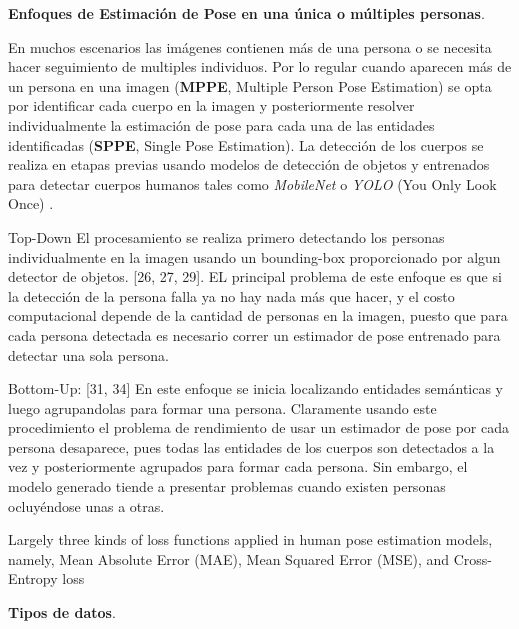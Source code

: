 \textbf{ Enfoques de Estimación de Pose en una única o múltiples personas}.

En muchos escenarios las imágenes contienen más de una persona o se necesita hacer seguimiento
de multiples individuos. Por lo regular cuando aparecen más de un persona en una imagen
(\textbf{MPPE}, Multiple Person Pose Estimation)
se opta por identificar cada cuerpo en la imagen y posteriormente resolver individualmente
la estimación de pose para cada una de las entidades identificadas (\textbf{SPPE}, Single Pose Estimation).
La detección de los cuerpos se realiza en
etapas previas usando modelos de detección de objetos y entrenados para detectar cuerpos
humanos tales como \textit{MobileNet} \cite{DBLP:journals/corr/RenHG015}
\cite{DBLP:journals/corr/HowardZCKWWAA17} \cite{DBLP:journals/corr/abs-1801-04381} o \textit{YOLO}
(You Only Look Once) \cite{DBLP:journals/corr/RedmonDGF15} \cite{DBLP:journals/corr/abs-2004-10934}.


Top-Down El procesamiento se realiza primero detectando los personas individualmente en la imagen
usando un bounding-box proporcionado por algun detector de objetos. [26, 27, 29].
EL principal problema de este enfoque es que si la detección de la persona falla ya no hay nada más
que hacer, y el costo computacional depende de la cantidad de personas en la imagen, puesto que para
cada persona detectada es necesario correr un estimador de pose entrenado para detectar una sola
persona.

Bottom-Up: [31, 34] En este enfoque se inicia localizando entidades semánticas y luego agrupandolas
para formar una persona. Claramente usando este procedimiento el problema de rendimiento de usar un
estimador de pose por cada persona desaparece, pues todas las entidades de los cuerpos son detectados
a la vez y posteriormente agrupados para formar cada persona. Sin embargo, el modelo generado tiende
a presentar problemas cuando existen personas ocluyéndose unas a otras.


Largely three kinds of loss functions applied in human pose estimation models, namely, Mean Absolute
Error (MAE), Mean Squared Error (MSE), and Cross-Entropy loss


\textbf{Tipos de datos}.

